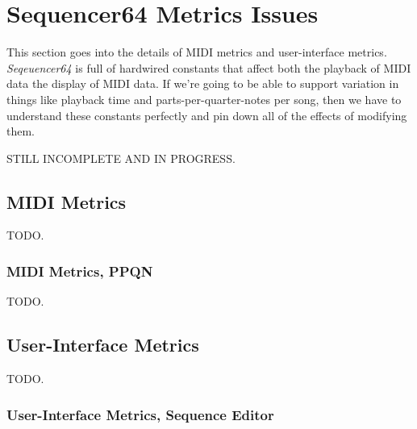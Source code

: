 %
%
%

\section{Sequencer64 Metrics Issues}
\label{sec:metrics_issues}

   This section goes into the details of MIDI metrics and user-interface
   metrics.  \textsl{Seqeuencer64} is full of hardwired constants that
   affect both the playback of MIDI data the display of MIDI data.
   If we're going to be able to support variation in things like playback time
   and parts-per-quarter-notes per song, then we have to understand these
   constants perfectly and pin down all of the effects of modifying them.

   STILL INCOMPLETE AND IN PROGRESS.

\subsection{MIDI Metrics}
\label{subsec:metrics_issues_midi}

   TODO.

\subsubsection{MIDI Metrics, PPQN}
\label{subsubsec:metrics_issues_midi_ppqn}

   TODO.

\subsection{User-Interface Metrics}
\label{subsec:metrics_issues_ui}

   TODO.

\subsubsection{User-Interface Metrics, Sequence Editor}
\label{subsubsec:metrics_issues_ui_seqedit}

